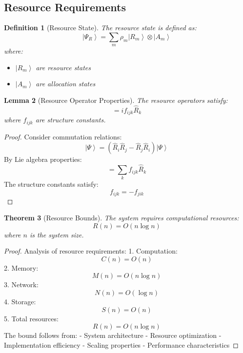 \documentclass[12pt]{article}
\newcommand{\ket}[1]{\left|#1\right\rangle}
\newcommand{\op}[1]{\hat{#1}}
\newtheorem{theorem}{Theorem}[section]
\newtheorem{lemma}[theorem]{Lemma}
\newtheorem{definition}[theorem]{Definition}
\begin{document}
\subsection{Resource Requirements}
\begin{definition}[Resource State]
The resource state is defined as:
\begin{equation}
\ket{\Psi_R} = \sum_m \rho_m\ket{R_m} \otimes \ket{A_m}
\end{equation}
where:
\begin{itemize}
\item $\ket{R_m}$ are resource states
\item $\ket{A_m}$ are allocation states
\end{itemize}
\end{definition}
\begin{lemma}[Resource Operator Properties]
The resource operators satisfy:
\begin{equation}
[\op{R}_i,\op{R}_j] = if_{ijk}\op{R}_k
\end{equation}
where $f_{ijk}$ are structure constants.
\end{lemma}
\begin{proof}
Consider commutation relations:
\begin{equation}
[\op{R}_i,\op{R}_j]\ket{\Psi} = (\op{R}_i\op{R}_j - \op{R}_j\op{R}_i)\ket{\Psi}
\end{equation}
By Lie algebra properties:
\begin{equation}
[\op{R}_i,\op{R}_j] = \sum_k f_{ijk}\op{R}_k
\end{equation}
The structure constants satisfy:
\begin{equation}
f_{ijk} = -f_{jik}
\end{equation}
\end{proof}
\begin{theorem}[Resource Bounds]
The system requires computational resources:
\begin{equation}
R(n) = O(n\log n)
\end{equation}
where $n$ is the system size.
\end{theorem}
\begin{proof}
Analysis of resource requirements:
1. Computation:
\begin{equation}
C(n) = O(n)
\end{equation}
2. Memory:
\begin{equation}
M(n) = O(n\log n)
\end{equation}
3. Network:
\begin{equation}
N(n) = O(\log n)
\end{equation}
4. Storage:
\begin{equation}
S(n) = O(n)
\end{equation}
5. Total resources:
\begin{equation}
R(n) = O(n\log n)
\end{equation}
The bound follows from:
- System architecture
- Resource optimization
- Implementation efficiency
- Scaling properties
- Performance characteristics
\end{proof}
\end{document}

